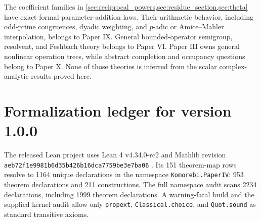 \documentclass[11pt]{article}
\theoremstyle{definition}
\theoremstyle{remark}
\newcommand{\leanname}[1]{\nolinkurl{#1}}
\begin{document}
The coefficient families in
\cref{sec:reciprocal_powers,sec:residue_section,sec:theta} have exact formal
parameter-addition laws. Their arithmetic behavior, including odd-prime
congruences, dyadic weighting, and $p$-adic or Amice--Mahler interpolation,
belongs to Paper IX. General bounded-operator semigroup, resolvent, and
Feshbach theory belongs to Paper VI. Paper III owns general nonlinear
operation trees, while abstract completion and occupancy questions belong to
Paper X. None of those theories is inferred from the scalar complex-analytic
results proved here.

\section{Formalization ledger for version 1.0.0}\label{sec:formalization_ledger}

The released Lean project uses Lean 4 v4.34.0-rc2 and Mathlib revision
\leanname{aeb72f1e9981b6d35b426b16dca7759be3e7ba06}
\cite{deMouraUllrich2021,mathlib2020}. Its 151 theorem-map rows resolve to
1164 unique declarations in the namespace \leanname{Komorebi.PaperIV}:
953 theorem declarations and 211 constructions. The full namespace audit scans
2234 declarations, including 1999 theorem declarations. A warning-fatal
build and the supplied kernel audit allow only
\leanname{propext}, \leanname{Classical.choice}, and
\leanname{Quot.sound} as standard transitive axioms.
\end{document}
